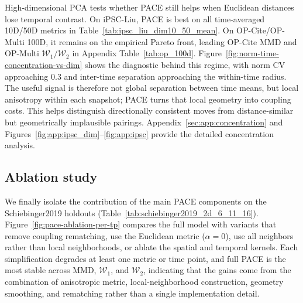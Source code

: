 High-dimensional PCA tests whether PACE still helps when Euclidean distances lose temporal contrast. On iPSC-Liu, PACE is best on all time-averaged 10D/50D metrics in Table~\ref{tab:ipsc_liu_dim10_50_mean}. On OP-Cite/OP-Multi 100D, it remains on the empirical Pareto front, leading OP-Cite MMD and OP-Multi $\mathcal{W}_1/\mathcal{W}_2$ in Appendix Table~\ref{tab:op_100d}. Figure~\ref{fig:norm-time-concentration-vs-dim} shows the diagnostic behind this regime, with norm CV approaching $0.3$ and inter-time separation approaching the within-time radius. The useful signal is therefore not global separation between time means, but local anisotropy within each snapshot; PACE turns that local geometry into coupling costs. This helps distinguish directionally consistent moves from distance-similar but geometrically implausible pairings. Appendix~\ref{sec:app:concentration} and Figures~\ref{fig:app:ipsc_dim}--\ref{fig:app:ipsc} provide the detailed concentration analysis.


\subsection{Ablation study}

We finally isolate the contribution of the main PACE components on the Schiebinger2019 holdouts (Table~\ref{tab:schiebinger2019_2d_6_11_16}). Figure~\ref{fig:pace-ablation-per-tp} compares the full model with variants that remove coupling rematching, use the Euclidean metric ($\alpha=0$), use all neighbors rather than local neighborhoods, or ablate the spatial and temporal kernels. Each simplification degrades at least one metric or time point, and full PACE is the most stable across MMD, $\mathcal{W}_1$, and $\mathcal{W}_2$, indicating that the gains come from the combination of anisotropic metric, local-neighborhood construction, geometry smoothing, and rematching rather than a single implementation detail.

